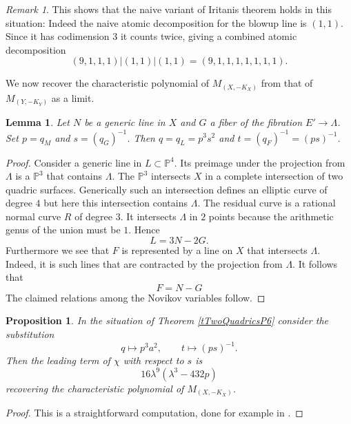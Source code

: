 \documentclass[11pt]{amsart}
\theoremstyle{plain}
\newtheorem{proposition}[theorem]{Proposition}
\newtheorem{lemma}[theorem]{Lemma}
\numberwithin{equation}{section}
\theoremstyle{definition}
\theoremstyle{remark}
\newtheorem{remark}[theorem]{Remark}
\renewcommand{\P}{\mathbb P}
\begin{document}
\begin{remark}
    This shows that the naive variant  of Iritanis theorem holds in this situation: Indeed the naive atomic decomposition for the blowup line is $(1,1)$. Since it has codimension 3 it counts twice, giving a combined atomic decomposition 
    \[
            (9,1,1,1)|(1,1)|(1,1) = (9,1,1,1,1,1,1,1).
    \]
\end{remark}

We now recover the characteristic polynomial of $M_{(X,-K_X)}$ from
that of $M_{(Y,-K_Y)}$ as a limit. 

\begin{lemma}
Let $N$ be a generic line in $X$ and $G$ a fiber of the fibration $E' \to \Lambda$. Set $p=q_M$ and $s = (q_G)^{-1}$.
Then $q = q_L = p^3s^2$ and $t = (q_F)^{-1} = (ps)^{-1}$.
\end{lemma}

\begin{proof}
Consider a generic line in $L \subset\P^4$. Its preimage under the projection from $\Lambda$ is a $\P^3$ that contains $\Lambda$. The $\P^3$ intersects $X$ in a complete intersection of two quadric surfaces. Generically such an intersection defines an elliptic curve of degree $4$ but here this intersection contains $\Lambda$. The residual curve is a rational normal curve $R$ of degree $3$. It intersects $\Lambda$ in $2$ points because the arithmetic genus of the union must be $1$. Hence
\[
    L = 3N-2G.
\]
Furthermore we see that $F$ is represented by a line on $X$ that intersects $\Lambda$. Indeed, it is such lines that are contracted by the projection from $\Lambda$. It follows that
\[
    F = N-G
\]
The claimed relations among the Novikov variables follow.     
\end{proof}

\begin{proposition}
    In the situation of Theorem \ref{tTwoQuadricsP6} consider the substitution
    \[
        q \mapsto p^3a^2, \quad \quad t \mapsto (ps)^{-1}.
    \]
    Then the leading term of $\chi$ with respect to $s$ is
    \[
        16\lambda^9(\lambda^3-432p)
    \]
    recovering the characteristic polynomial of $M_{(X,-K_X)}$.
\end{proposition}

\begin{proof}
    This is a straightforward computation, done for example in \cite{BvBS26}.
\end{proof}
\
\end{document}
